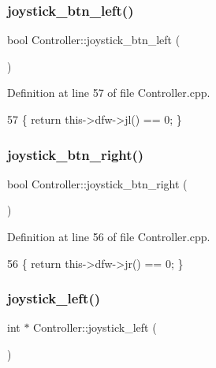 \subsubsection{\texorpdfstring{joystick\+\_\+btn\+\_\+left()}{joystick\_btn\_left()}}
{\footnotesize\ttfamily bool Controller\+::joystick\+\_\+btn\+\_\+left (\begin{DoxyParamCaption}{ }\end{DoxyParamCaption})}



Definition at line 57 of file Controller.\+cpp.


\begin{DoxyCode}
57 \{ \textcolor{keywordflow}{return} this->dfw->jl() == 0; \}
\end{DoxyCode}
\mbox{\label{class_controller_a3710226224d7d95b1495bcac853abbe8}} 
\subsubsection{\texorpdfstring{joystick\+\_\+btn\+\_\+right()}{joystick\_btn\_right()}}
{\footnotesize\ttfamily bool Controller\+::joystick\+\_\+btn\+\_\+right (\begin{DoxyParamCaption}{ }\end{DoxyParamCaption})}



Definition at line 56 of file Controller.\+cpp.


\begin{DoxyCode}
56 \{ \textcolor{keywordflow}{return} this->dfw->jr() == 0; \}
\end{DoxyCode}
\mbox{\label{class_controller_a2d21a10299aaacdcdb571b10f6436270}} 
\subsubsection{\texorpdfstring{joystick\+\_\+left()}{joystick\_left()}}
{\footnotesize\ttfamily int $\ast$ Controller\+::joystick\+\_\+left (\begin{DoxyParamCaption}{ }\end{DoxyParamCaption})}



